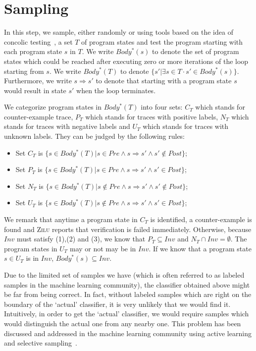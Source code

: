 
\section{Sampling}
In this step, we sample, either randomly or using tools based on the idea of concolic testing~\cite{}, 
a set $T$ of program states and test the program starting with each program state $s$ in $T$. 
We write $Body^*(s)$ to denote the set of program states which could be reached after executing zero or more iterations of the loop starting from $s$. 
We write $Body^*(T)$ to denote $\{s' | \exists s \in T \cdot s' \in Body^*(s)\}$. 
Furthermore, we write $s \Rightarrow s'$ to denote that starting with a program state $s$ would result in state $s'$ when the loop terminates. 

We categorize program states in $Body^*(T)$ into four sets:
$C_T$ which stands for counter-example trace, 
$P_T$ which stands for traces with positive labels, 
$N_T$ which stands for traces with negative labels 
and $U_T$ which stands for traces with unknown labels.
They can be judged by the following rules: 
\begin{itemize}
    \item Set $C_T$ is $\{s \in Body^*(T) | s \in Pre \land s \Rightarrow s' \land s' \notin Post\}$;
    \item Set $P_T$ is $\{s \in Body^*(T) | s \in Pre \land s \Rightarrow s' \land s' \in Post\}$;
    \item Set $N_T$ is $\{s \in Body^*(T) | s \notin Pre \land s \Rightarrow s' \land s' \notin Post\}$;
    \item Set $U_T$ is $\{s \in Body^*(T) | s \notin Pre \land s \Rightarrow s' \land s' \in Post\}$;
\end{itemize}
We remark that anytime a program state in $C_T$ is identified, a counter-example is found and \textsc{Zilu} reports that verification is failed immediately. 
Otherwise, because $Inv$ must satisfy (1),(2) and (3), we know that $P_T \subseteq Inv$ and $N_T \cap Inv = \emptyset$. 
The program states in $U_T$ may or not may be in $Inv$. 
If we know that a program state $s \in U_T$ is in $Inv$, $Body^*(s) \subseteq Inv$.



Due to the limited set of samples we have (which is often referred to as labeled samples in the machine learning community), 
the classifier obtained above might be far from being correct. 
In fact, without labeled samples which are right on the boundary of the `actual' classifier, 
it is very unlikely that we would find it. 
Intuitively, in order to get the `actual' classifier, we would require samples which would distinguish the actual one from any nearby one. 
This problem has been discussed and addressed in the machine learning community using active learning and selective sampling~\cite{DBLP:conf/icml/SchohnC00}.

